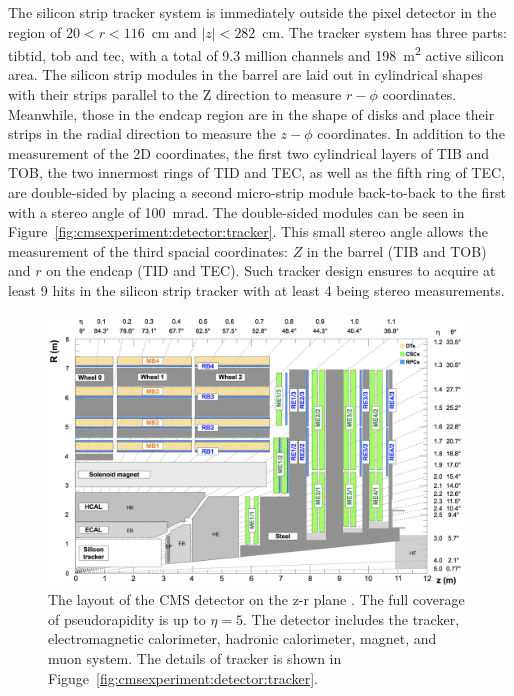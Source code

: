 The silicon strip tracker system is immediately outside the pixel detector in the region of $20<r<116$~cm and $|z|<282$~cm. The tracker system has three parts: \acrfull{tibtid}, \acrfull{tob} and \acrfull{tec}, with a total of 9.3 million channels and 198~\si{\m \squared} active silicon area. The silicon strip modules in the barrel are laid out in cylindrical shapes with their strips parallel to the Z direction to measure $r-\phi$ coordinates. Meanwhile, those in the endcap region are in the shape of disks and place their strips in the radial direction to measure the $z-\phi$ coordinates. In addition to the measurement of the 2D coordinates, the first two cylindrical layers of TIB and TOB, the two innermost rings of TID and TEC, as well as the fifth ring of TEC, are double-sided by placing a second micro-strip module back-to-back to the first with a stereo angle of 100~mrad. The double-sided modules can be seen in Figure~\ref{fig:cmsexperiment:detector:tracker}. This small stereo angle allows the measurement of the third spacial coordinates: $Z$ in the barrel (TIB and TOB) and $r$ on the endcap (TID and TEC). Such tracker design ensures to acquire at least 9 hits in the silicon strip tracker with at least 4 being stereo measurements. 




\begin{figure}[ht]
    \centering
    \includegraphics[width=0.98\textwidth]{chapters/CMSExperiment/sectionDetector/figures/detectorLayout.png}
    \caption{The layout of the CMS detector on the z-r plane \cite{cms:muonChamberWebsite}. The full coverage of pseudorapidity is up to $\eta=5$. The detector includes the tracker, electromagnetic calorimeter, hadronic calorimeter, magnet, and muon system. The details of tracker is shown in Figuge~\ref{fig:cmsexperiment:detector:tracker}. }
    \label{fig:cmsexperiment:detector:detectorLayout}
\end{figure}





